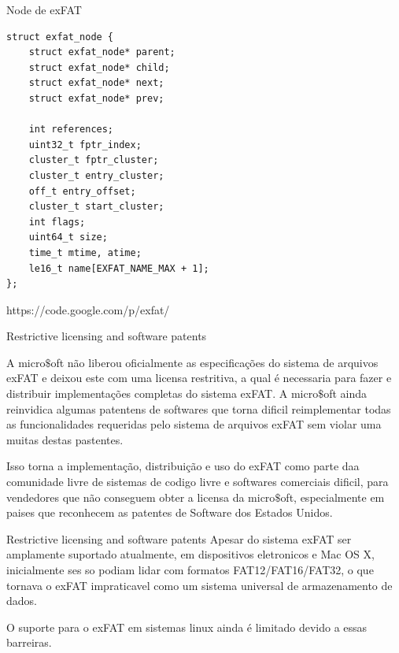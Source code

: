 \documentclass[11pt]{beamer}
\begin{document}
\begin{frame}[fragile]{Node de exFAT}
\begin{lstlisting}
struct exfat_node {
	struct exfat_node* parent;
	struct exfat_node* child;
	struct exfat_node* next;
	struct exfat_node* prev;

	int references;
	uint32_t fptr_index;
	cluster_t fptr_cluster;
	cluster_t entry_cluster;
	off_t entry_offset;
	cluster_t start_cluster;
	int flags;
	uint64_t size;
	time_t mtime, atime;
	le16_t name[EXFAT_NAME_MAX + 1];
};
\end{lstlisting}
https://code.google.com/p/exfat/
\end{frame}



\begin{frame}{Restrictive licensing and software patents}

A micro$\$$oft não liberou oficialmente as especificações do sistema de arquivos exFAT e deixou este com uma licensa restritiva, a qual é necessaria para fazer e distribuir implementações completas do sistema exFAT. A micro$\$$oft ainda reinvidica algumas patentens de softwares que torna dificil reimplementar todas as funcionalidades requeridas pelo sistema de arquivos exFAT sem violar uma muitas destas pastentes.

Isso torna a implementação, distribuição e uso do exFAT como parte daa comunidade livre de sistemas de codigo livre e softwares comerciais dificil, para vendedores que não conseguem obter a licensa da micro$\$$oft,  especialmente em paises que reconhecem as patentes de Software dos Estados Unidos.
\end{frame}

\begin{frame}{Restrictive licensing and software patents}
Apesar do sistema exFAT ser amplamente suportado atualmente, em dispositivos eletronicos e Mac OS X, inicialmente ses so podiam lidar com formatos FAT12/FAT16/FAT32, o que tornava o exFAT impraticavel como um sistema universal de armazenamento de dados. 

O suporte para o exFAT em sistemas linux ainda é limitado devido a essas barreiras.
\end{frame}
\end{document}
